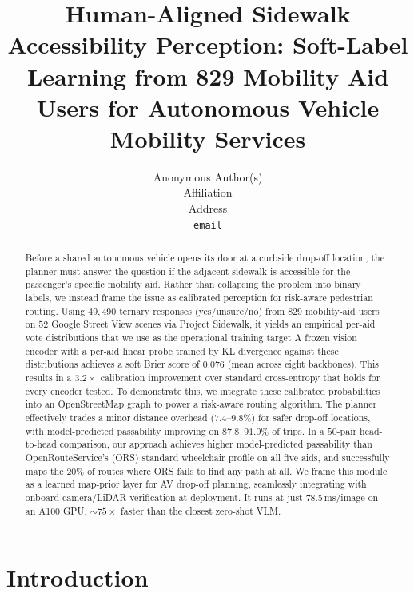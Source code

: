 \documentclass{article}
\title{Human-Aligned Sidewalk Accessibility Perception: Soft-Label Learning from 829 Mobility Aid Users for Autonomous Vehicle Mobility Services}
\author{
  Anonymous Author(s) \\
  Affiliation \\
  Address \\
  \texttt{email} \\
}
\begin{document}
\maketitle

\begin{abstract}
Before a shared autonomous vehicle opens its door at a curbside drop-off location, the planner must answer the question if the adjacent sidewalk is accessible for the passenger’s specific mobility aid. Rather than collapsing the problem into binary labels, we instead frame the issue as calibrated perception for risk-aware pedestrian routing. Using $49{,}490$ ternary responses (yes/unsure/no) from $829$ mobility-aid users on $52$ Google Street View scenes via Project Sidewalk, it yields an empirical per-aid vote distributions that we use as the operational training target A frozen vision encoder with a per-aid linear probe trained by KL divergence against these distributions achieves a soft Brier score of $0.076$ (mean across eight backbones). This results in a $\mathbf{3.2\times}$ calibration improvement over standard cross-entropy that holds for every encoder tested. To demonstrate this, we integrate these calibrated probabilities into an OpenStreetMap graph to power a risk-aware routing algorithm. The planner effectively trades a minor distance overhead ($7.4$--$9.8\%$) for safer drop-off locations, with model-predicted passability improving on $87.8$--$91.0\%$ of trips. In a $50$-pair head-to-head comparison, our approach achieves higher model-predicted passability than OpenRouteService's (ORS) standard wheelchair profile on all five aids, and successfully maps the $20\%$ of routes where ORS fails to find any path at all. We frame this module as a learned map-prior layer for AV drop-off planning, seamlessly integrating with onboard camera/LiDAR verification at deployment. It runs at just 78.5\,ms/image on an A100 GPU, ${\sim}75\times$ faster than the closest zero-shot VLM.
\end{abstract}


\section{Introduction}
\label{sec:intro}
\end{document}
